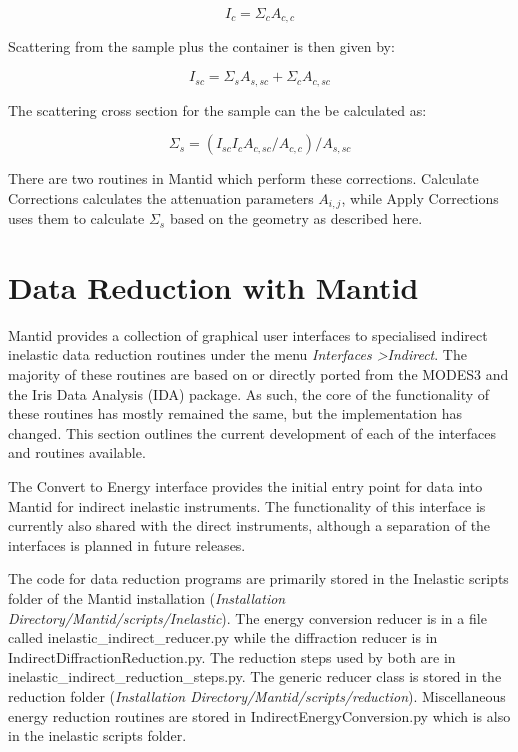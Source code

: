 \documentclass[paper=a4, fontsize=11pt]{scrartcl}	%
\numberwithin{equation}{section}															%
\numberwithin{figure}{section}																%
\numberwithin{table}{section}																%
\begin{document}
\begin{equation}
I_c = \Sigma_c A_{c,c}
\end{equation}

Scattering from the sample plus the container is then given by:

\begin{equation}
I_{sc} = \Sigma_s A_{s,sc} + \Sigma_c A_{c,sc}
\end{equation}

The scattering cross section for the sample can the be calculated as:

\begin{equation}
\Sigma_s = (I_{sc}I_cA_{c,sc}/A_{c,c}) / A_{s,sc}
\end{equation}

There are two routines in Mantid which perform these corrections. Calculate Corrections calculates the attenuation parameters $A_{i,j}$, while Apply Corrections uses them to calculate $\Sigma_s$ based on the geometry as described here.

\section{Data Reduction with Mantid}
Mantid provides a collection of graphical user interfaces to specialised indirect inelastic data reduction routines under the menu \textit{Interfaces \textgreater Indirect}. The majority of these routines are based on or directly ported from the MODES3 and the Iris Data Analysis (IDA) package\cite{wshowells2010}. As such, the core of the functionality of these routines has mostly remained the same, but the implementation has changed. This section outlines the current development of each of the interfaces and routines available.

The Convert to Energy interface provides the initial entry point for data into Mantid for indirect inelastic instruments. The functionality of this interface is currently also shared with the direct instruments, although a separation of the interfaces is planned in future releases.

The code for data  reduction programs are primarily stored in the Inelastic scripts folder of the Mantid installation (\textit{Installation Directory/Mantid/scripts/Inelastic}). The energy conversion reducer is in a file called inelastic\_indirect\_reducer.py while the diffraction reducer is in IndirectDiffractionReduction.py. The reduction steps used by both are in inelastic\_indirect\_reduction\_steps.py. The generic reducer class is stored in the reduction folder (\textit{Installation Directory/Mantid/scripts/reduction}). Miscellaneous energy reduction routines are stored in IndirectEnergyConversion.py which is also in the inelastic scripts folder.
\end{document}
